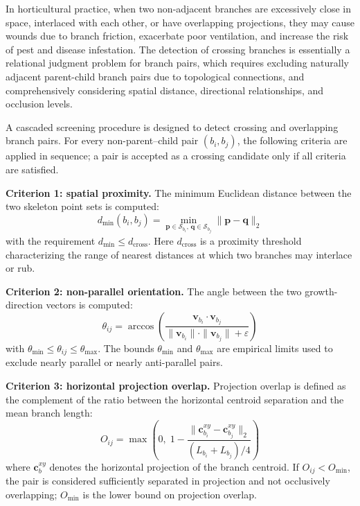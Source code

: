 \documentclass[12pt,a4paper,fontset=fandol]{ctexart}
\newcommand{\vb}[1][b]{\mathbf{v}_{#1}}
\newcommand{\cb}[1][b]{\mathbf{c}_{#1}}
\begin{document}
In horticultural practice, when two non-adjacent branches are excessively close in space, interlaced with each other, or have overlapping projections, they may cause wounds due to branch friction, exacerbate poor ventilation, and increase the risk of pest and disease infestation. The detection of crossing branches is essentially a relational judgment problem for branch pairs, which requires excluding naturally adjacent parent-child branch pairs due to topological connections, and comprehensively considering spatial distance, directional relationships, and occlusion levels.

A cascaded screening procedure is designed to detect crossing and overlapping branch pairs.
For every non-parent--child pair $(b_i, b_j)$, the following criteria are applied in sequence;
a pair is accepted as a crossing candidate only if all criteria are satisfied.

\textbf{Criterion 1: spatial proximity.}
The minimum Euclidean distance between the two skeleton point sets is computed:
\begin{equation}\label{eq:crossing_dist}
  d_{\min}(b_i, b_j) = \min_{\mathbf{p} \in \mathcal{S}_{b_i},\, \mathbf{q} \in \mathcal{S}_{b_j}} \|\mathbf{p} - \mathbf{q}\|_2
\end{equation}
with the requirement $d_{\min} \leq d_{\text{cross}}$.
Here $d_{\text{cross}}$ is a proximity threshold characterizing the range of nearest distances at which two branches may interlace or rub.

\textbf{Criterion 2: non-parallel orientation.}
The angle between the two growth-direction vectors is computed:
\begin{equation}\label{eq:crossing_angle}
  \theta_{ij} = \arccos\left(\frac{\vb[b_i] \cdot \vb[b_j]}{\|\vb[b_i]\| \cdot \|\vb[b_j]\| + \varepsilon}\right)
\end{equation}
with $\theta_{\min} \leq \theta_{ij} \leq \theta_{\max}$.
The bounds $\theta_{\min}$ and $\theta_{\max}$ are empirical limits used to exclude nearly parallel or nearly anti-parallel pairs.

\textbf{Criterion 3: horizontal projection overlap.}
Projection overlap is defined as the complement of the ratio between the horizontal centroid separation and the mean branch length:
\begin{equation}\label{eq:overlap}
  O_{ij} = \max\!\left(0,\; 1 - \frac{\|\cb[b_i]^{xy} - \cb[b_j]^{xy}\|_2}{(L_{b_i} + L_{b_j})/4}\right)
\end{equation}
where $\cb^{xy}$ denotes the horizontal projection of the branch centroid.
If $O_{ij} < O_{\min}$, the pair is considered sufficiently separated in projection and not occlusively overlapping;
$O_{\min}$ is the lower bound on projection overlap.
\end{document}
